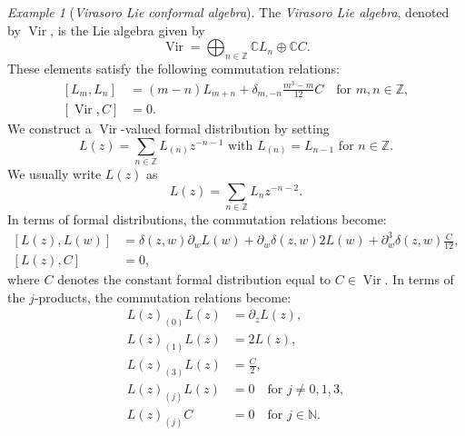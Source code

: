 \documentclass[a4paper, 12pt, reqno]{amsart}
\theoremstyle{remark}
\newtheorem{example}[theorem]{Example}
\DeclareMathOperator{\Vir}{Vir}
\begin{document}
\begin{example}[\emph{Virasoro Lie conformal algebra}]
  \label{exa:1}
  The \emph{Virasoro Lie algebra}, denoted by $\Vir$, is the Lie algebra given by
  \begin{equation*}
    \Vir = \bigoplus_{n \in \mathbb{Z}}\mathbb{C}L_n \oplus \mathbb{C}C.
  \end{equation*}
  These elements satisfy the following commutation relations:
  \begin{equation}
    \label{eq:6}
    \begin{split}
      [L_m, L_n] &= (m - n)L_{m + n} + \delta_{m, -n}\frac{m^3 - m}{12}C \quad \text{for $m, n \in \mathbb{Z}$}, \\
      [\Vir, C] &= 0.
    \end{split}
  \end{equation}
  We construct a $\Vir$-valued formal distribution by setting
  \begin{equation*}
    \text{$L(z) = \sum_{n \in \mathbb{Z}}L_{(n)}z^{-n - 1}$ with $L_{(n)} = L_{n - 1}$ for $n \in \mathbb{Z}$}.
  \end{equation*}
  We usually write $L(z)$ as
  \begin{equation*}
    L(z) = \sum_{n \in \mathbb{Z}}L_nz^{-n - 2}.
  \end{equation*}
  In terms of formal distributions, the commutation relations become:
  \begin{equation}
    \label{eq:7}
    \begin{split}
      [L(z), L(w)] &= \delta(z, w)\partial_wL(w) + \partial_w\delta(z, w)2L(w) + \partial^3_w\delta(z, w)\frac{C}{12}, \\
      [L(z), C] &= 0,
    \end{split}
  \end{equation}
  where $C$ denotes the constant formal distribution equal to $C \in \Vir$.
  In terms of the $j$-products, the commutation relations become:
  \begin{equation}
    \label{eq:8}
    \begin{split}
      L(z)_{(0)}L(z) &= \partial_zL(z), \\
      L(z)_{(1)}L(z) &= 2L(z), \\
      L(z)_{(3)}L(z) &= \frac{C}{2}, \\
      L(z)_{(j)}L(z) &= 0 \quad \text{for $j \neq 0, 1, 3$}, \\
      L(z)_{(j)}C &= 0 \quad \text{for $j \in \mathbb{N}$}.
    \end{split}
  \end{equation}

\end{example}
\end{document}
